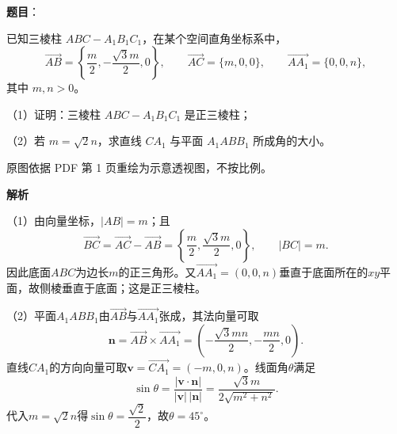 \begin{answer}

\textbf{题目}：

已知三棱柱 $ABC-A_1B_1C_1$，在某个空间直角坐标系中，
\nopagebreak[4]
\[
\overrightarrow{AB}=\left\{\dfrac m2,-\dfrac{\sqrt3m}{2},0\right\},\qquad
\overrightarrow{AC}=\{m,0,0\},\qquad
\overrightarrow{AA_1}=\{0,0,n\},
\]
其中 $m,n>0$。

（1）证明：三棱柱 $ABC-A_1B_1C_1$ 是正三棱柱；

（2）若 $m=\sqrt2n$，求直线 $CA_1$ 与平面 $A_1ABB_1$ 所成角的大小。

\begin{gktip}
原图依据 PDF 第 1 页重绘为示意透视图，不按比例。
\end{gktip}
\nopagebreak[4]
\begin{center}\end{center}
\nopagebreak[4]
\textbf{解析}

（1）由向量坐标，$|AB|=m$；且
\nopagebreak[4]
\[
\overrightarrow{BC}=\overrightarrow{AC}-\overrightarrow{AB}
=\left\{\frac m2,\frac{\sqrt3m}{2},0\right\},\qquad |BC|=m.
\]
因此底面$ABC$为边长$m$的正三角形。又$\overrightarrow{AA_1}=(0,0,n)$垂直于底面所在的$xy$平面，故侧棱垂直于底面；这是正三棱柱。

（2）平面$A_1ABB_1$由$\overrightarrow{AB}$与$\overrightarrow{AA_1}$张成，其法向量可取
\nopagebreak[4]
\[
\boldsymbol n=\overrightarrow{AB}\times\overrightarrow{AA_1}
=\left(-\frac{\sqrt3mn}{2},-\frac{mn}{2},0\right).
\]
直线$CA_1$的方向向量可取$\boldsymbol v=\overrightarrow{CA_1}=(-m,0,n)$。线面角$\theta$满足
\nopagebreak[4]
\[
\sin\theta=\frac{|\boldsymbol v\cdot\boldsymbol n|}
{|\boldsymbol v|\,|\boldsymbol n|}
=\frac{\sqrt3m}{2\sqrt{m^2+n^2}}.
\]
代入$m=\sqrt2n$得$\sin\theta=\dfrac{\sqrt2}{2}$，故$\theta=45^\circ$。


\end{answer}

